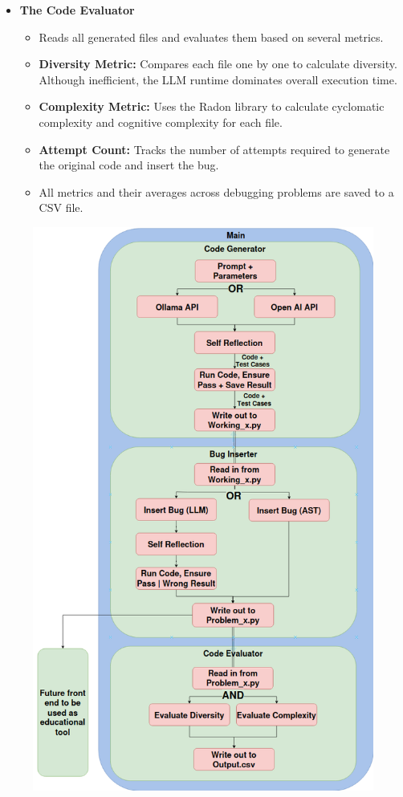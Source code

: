\documentclass[12pt]{extarticle}
\begin{document}
\begin{itemize}
    \item \textbf{The Code Evaluator}
    \begin{itemize}
        \item Reads all generated files and evaluates them based on several metrics.
        \item \textbf{Diversity Metric:} Compares each file one by one to calculate diversity. Although inefficient, the LLM runtime dominates overall execution time.
        \item \textbf{Complexity Metric:} Uses the Radon library to calculate cyclomatic complexity and cognitive complexity for each file.
        \item \textbf{Attempt Count:} Tracks the number of attempts required to generate the original code and insert the bug.
        \item All metrics and their averages across debugging problems are saved to a CSV file.
    \end{itemize}
\end{itemize}

\begin{figure}[htbp]
\centering
\includegraphics[width=0.7\linewidth]{Images/Tall_Design.png}
\label{fig:tall_design}
\end{figure}
\end{document}
